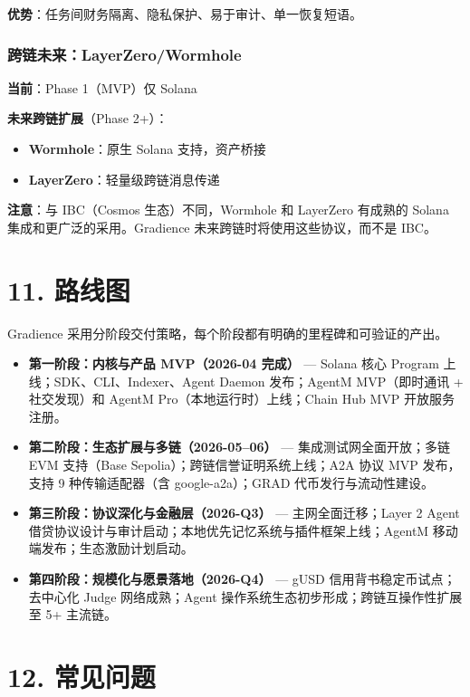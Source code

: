 \documentclass[11pt,a4paper]{article}
\begin{document}
\textbf{优势}：任务间财务隔离、隐私保护、易于审计、单一恢复短语。

\subsubsection{跨链未来：LayerZero/Wormhole}

\textbf{当前}：Phase 1（MVP）仅 Solana

\textbf{未来跨链扩展}（Phase 2+）：
\begin{itemize}[leftmargin=2em]
\item \textbf{Wormhole}：原生 Solana 支持，资产桥接
\item \textbf{LayerZero}：轻量级跨链消息传递
\end{itemize}

\textbf{注意}：与 IBC（Cosmos 生态）不同，Wormhole 和 LayerZero 有成熟的 Solana 集成和更广泛的采用。Gradience 未来跨链时将使用这些协议，而不是 IBC。

\section{11. 路线图}

Gradience 采用分阶段交付策略，每个阶段都有明确的里程碑和可验证的产出。

\begin{itemize}[nosep]
  \item \textbf{第一阶段：内核与产品 MVP（2026-04 完成）} --- Solana 核心 Program 上线；SDK、CLI、Indexer、Agent Daemon 发布；AgentM MVP（即时通讯 + 社交发现）和 AgentM Pro（本地运行时）上线；Chain Hub MVP 开放服务注册。
  \item \textbf{第二阶段：生态扩展与多链（2026-05--06）} --- 集成测试网全面开放；多链 EVM 支持（Base Sepolia）；跨链信誉证明系统上线；A2A 协议 MVP 发布，支持 9 种传输适配器（含 google-a2a）；GRAD 代币发行与流动性建设。
  \item \textbf{第三阶段：协议深化与金融层（2026-Q3）} --- 主网全面迁移；Layer 2 Agent 借贷协议设计与审计启动；本地优先记忆系统与插件框架上线；AgentM 移动端发布；生态激励计划启动。
  \item \textbf{第四阶段：规模化与愿景落地（2026-Q4）} --- gUSD 信用背书稳定币试点；去中心化 Judge 网络成熟；Agent 操作系统生态初步形成；跨链互操作性扩展至 5+ 主流链。
\end{itemize}

\section{12. 常见问题}
\end{document}
